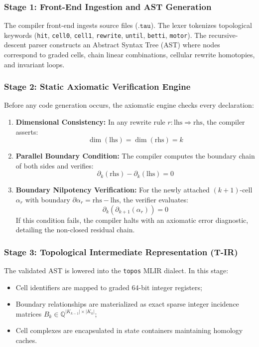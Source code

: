 \subsubsection{Stage 1: Front-End Ingestion and AST Generation}
The compiler front-end ingests \ToposLang{} source files ($\texttt{.tau}$). The lexer tokenizes topological keywords (\texttt{hit}, \texttt{cell0}, \texttt{cell1}, \texttt{rewrite}, \texttt{until}, \texttt{betti}, \texttt{motor}). The recursive-descent parser constructs an Abstract Syntax Tree (AST) where nodes correspond to graded cells, chain linear combinations, cellular rewrite homotopies, and invariant loops.

\subsubsection{Stage 2: Static Axiomatic Verification Engine}
Before any code generation occurs, the axiomatic engine checks every declaration:
\begin{enumerate}
    \item \textbf{Dimensional Consistency:} In any rewrite rule $r : \text{lhs} \Rightarrow \text{rhs}$, the compiler asserts:
    \begin{equation}
        \dim(\text{lhs}) = \dim(\text{rhs}) = k
    \end{equation}
    \item \textbf{Parallel Boundary Condition:} The compiler computes the boundary chain of both sides and verifies:
    \begin{equation}
        \partial_k(\text{rhs}) - \partial_k(\text{lhs}) = 0
    \end{equation}
    \item \textbf{Boundary Nilpotency Verification:} For the newly attached $(k+1)$-cell $\alpha_r$ with boundary $\partial \alpha_r = \text{rhs} - \text{lhs}$, the verifier evaluates:
    \begin{equation}
        \partial_k(\partial_{k+1}(\alpha_r)) = 0
    \end{equation}
    If this condition fails, the compiler halts with an axiomatic error diagnostic, detailing the non-closed residual chain.
\end{enumerate}

\subsubsection{Stage 3: Topological Intermediate Representation (T-IR)}
The validated AST is lowered into the \texttt{topos} MLIR dialect. In this stage:
\begin{itemize}
    \item Cell identifiers are mapped to graded 64-bit integer registers;
    \item Boundary relationships are materialized as exact sparse integer incidence matrices $B_k \in \mathbb{Q}^{|K_{k-1}| \times |K_k|}$;
    \item Cell complexes are encapsulated in state containers maintaining homology caches.
\end{itemize}

